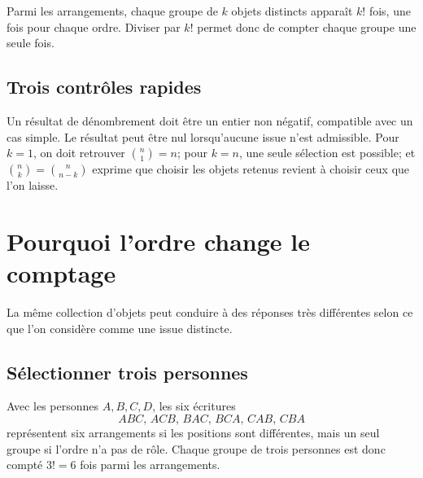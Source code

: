 \begin{connectionbox}
Parmi les arrangements, chaque groupe de $k$ objets distincts apparaît $k!$ fois, une fois pour chaque ordre. Diviser par $k!$ permet donc de compter chaque groupe une seule fois.
\end{connectionbox}

\subsection{Trois contrôles rapides}
Un résultat de dénombrement doit être un entier non négatif, compatible avec un cas simple. Le résultat peut être nul lorsqu'aucune issue n'est admissible. Pour $k=1$, on doit retrouver $\binom n1=n$; pour $k=n$, une seule sélection est possible; et $\binom nk=\binom n{n-k}$ exprime que choisir les objets retenus revient à choisir ceux que l'on laisse.


\section{Pourquoi l'ordre change le comptage}
\label{manual:section:07.08}

La même collection d'objets peut conduire à des réponses très différentes selon ce que l'on considère comme une issue distincte.

\subsection{Sélectionner trois personnes}
Avec les personnes $A,B,C,D$, les six écritures
\[
ABC,\,ACB,\,BAC,\,BCA,\,CAB,\,CBA
\]
représentent six arrangements si les positions sont différentes, mais un seul groupe si l'ordre n'a pas de rôle. Chaque groupe de trois personnes est donc compté $3!=6$ fois parmi les arrangements.

\begin{center}
\end{center}

